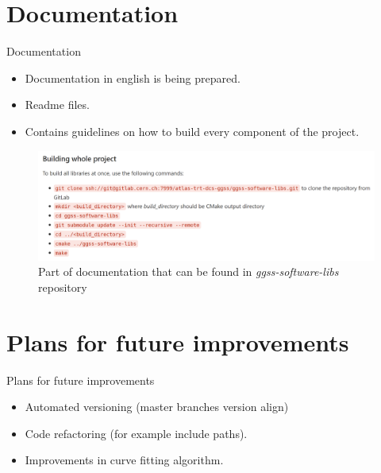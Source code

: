 \documentclass[10pt]{beamer}
\begin{document}
\section {Documentation}

\begin{frame}{Documentation}
\begin{itemize}
  \item Documentation in english is being prepared.
  \item Readme files.
  \item Contains guidelines on how to build every component of the project.
\end{itemize}
\begin{figure}
    \centering
    \includegraphics[width=\linewidth]{resources/documentation}
    \caption{Part of documentation that can be found in \textit{ggss-software-libs} repository}
\end{figure}
\end{frame}


\section {Plans for future improvements}

\begin{frame}{Plans for future improvements}
\begin{itemize}
\item Automated versioning (master branches version align)
\item Code refactoring (for example include paths).
\item Improvements in curve fitting algorithm.
\end{itemize}
\end{frame}


\begin{frame}
\end{frame}
\end{document}
